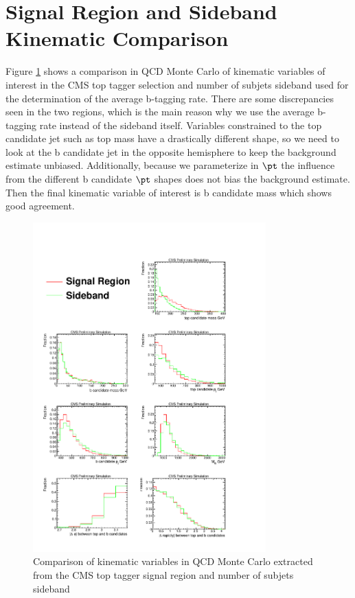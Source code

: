 \section{Signal Region and Sideband Kinematic Comparison}
\label{sec:SBvsSR}
Figure \ref{figs:SBtoSR} shows a comparison in QCD Monte Carlo of kinematic variables of interest in the CMS top tagger selection and number of subjets sideband used for the determination of the average b-tagging rate.  There are some discrepancies 
seen in the two regions, which is the main reason why we use the average b-tagging rate instead of the sideband itself.  Variables constrained to the top candidate jet such as top mass have a drastically different shape, so we need to look at the 
b candidate jet in the opposite hemisphere to keep the background estimate unbiased.  Additionally, because we parameterize in $\pt$ the influence from the different b candidate $\pt$ shapes does not bias the background estimate.  Then the final 
kinematic variable of interest is b candidate mass which shows good agreement.  


\begin{figure}[Htcb]
\centering
\includegraphics[width=0.8\textwidth]{figs/SBtoSR.pdf}
\caption{Comparison of kinematic variables in QCD Monte Carlo extracted from the CMS top tagger signal region and number of subjets sideband}
\label{figs:SBtoSR}
\end{figure}



